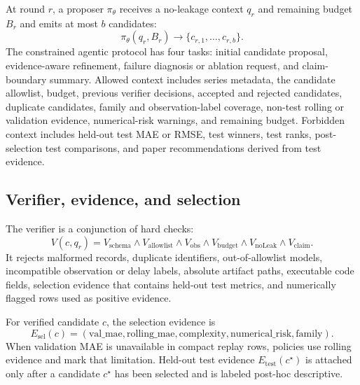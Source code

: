 At round $r$, a proposer $\pi_\theta$ receives a no-leakage context $q_r$ and
remaining budget $B_r$ and emits at most $b$ candidates:
\begin{equation}
\pi_\theta(q_r,B_r)\rightarrow \{c_{r,1},\ldots,c_{r,b}\}.
\end{equation}
The constrained agentic protocol has four tasks: initial candidate proposal,
evidence-aware refinement, failure diagnosis or ablation request, and
claim-boundary summary. Allowed context includes series metadata, the
candidate allowlist, budget, previous verifier decisions, accepted and
rejected candidates, duplicate candidates, family and observation-label
coverage, non-test rolling or validation evidence, numerical-risk warnings,
and remaining budget. Forbidden context includes held-out test MAE or RMSE,
test winners, test ranks, post-selection test comparisons, and paper
recommendations derived from test evidence.

\subsection{Verifier, evidence, and selection}

The verifier is a conjunction of hard checks:
\begin{equation}
V(c,q_r) =
V_{\mathrm{schema}}\wedge
V_{\mathrm{allowlist}}\wedge
V_{\mathrm{obs}}\wedge
V_{\mathrm{budget}}\wedge
V_{\mathrm{noLeak}}\wedge
V_{\mathrm{claim}}.
\end{equation}
It rejects malformed records, duplicate identifiers, out-of-allowlist models,
incompatible observation or delay labels, absolute artifact paths, executable
code fields, selection evidence that contains held-out test metrics, and
numerically flagged rows used as positive evidence.

For verified candidate $c$, the selection evidence is
\begin{equation}
E_{\mathrm{sel}}(c)=
(\mathrm{val\_mae},\mathrm{rolling\_mae},
\mathrm{complexity},\mathrm{numerical\_risk},\mathrm{family}).
\end{equation}
When validation MAE is unavailable in compact replay rows, policies use rolling
evidence and mark that limitation. Held-out test evidence
$E_{\mathrm{test}}(c^\star)$ is attached only after a candidate $c^\star$ has
been selected and is labeled post-hoc descriptive.

